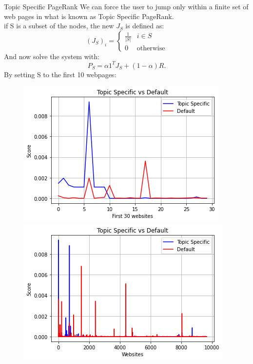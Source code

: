 \documentclass[10pt]{beamer}
\begin{document}
\begin{frame}{Topic Specific PageRank}
We can force the user to jump only within a finite set of web pages in what is known as Topic Specific PageRank.
\\
if S is a subset of the nodes, the new $J_S$ is defined as:
$$ (J_S)_{i} = 
\begin{cases}
  \frac{1}{|S|} & i \in S \\
       0 & \text{otherwise} 
\end{cases}
$$
And now solve the system with: $$P_S = \alpha 1^T J_S + (1-\alpha) R.$$
By setting S to the first 10 webpages:
\begin{figure}[!tbp]
  \centering
  \begin{minipage}[b]{0.4\textwidth}
    \includegraphics[width=\textwidth]{first30}
  \end{minipage}
  \hfill
  \begin{minipage}[b]{0.4\textwidth}
    \includegraphics[width=\textwidth]{first30_2}
  \end{minipage}
\end{figure}
\end{frame}
\end{document}
